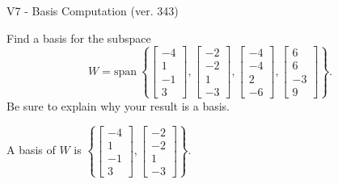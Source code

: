 \begin{exercise}
  \begin{exerciseTitle}V7 - Basis Computation (ver. 343)\end{exerciseTitle}
  \begin{exerciseStatement}
    Find a basis for the subspace 
\[W=\mathrm{span}\ \left\{\left[\begin{array}{r}
-4 \\
1 \\
-1 \\
3
\end{array}\right] , \left[\begin{array}{r}
-2 \\
-2 \\
1 \\
-3
\end{array}\right] , \left[\begin{array}{r}
-4 \\
-4 \\
2 \\
-6
\end{array}\right] , \left[\begin{array}{r}
6 \\
6 \\
-3 \\
9
\end{array}\right]\right\}.\]
 Be sure to explain why your result is a basis.


  \end{exerciseStatement}
  \begin{exerciseAnswer}
   A basis of \(W\) is  \(\left\{\left[\begin{array}{r}
-4 \\
1 \\
-1 \\
3
\end{array}\right] , \left[\begin{array}{r}
-2 \\
-2 \\
1 \\
-3
\end{array}\right]\right\}\).
  


  \end{exerciseAnswer}
\end{exercise}